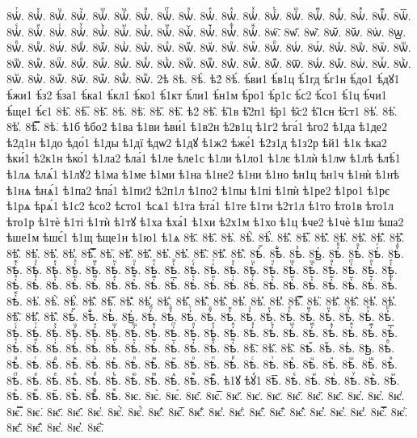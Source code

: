{8ѡ҆ⷮ.
8ѡ҆ⷯ.
8ѡ҆ⷰ.
8ѡ҆ⷱ.
8ѡ҆ⷲ.
8ѡ҆ⷳ.
8ѡ҆ⷴ.
8ѡ҆ⷵ.
8ѡ҆ⷶ.
8ѡ҆ⷷ.
8ѡ҆ⷸ.
8ѡ҆ⷹ.
8ѡ҆ⷺ.
8ѡ҆ⷻ.
8ѡ҆ⷼ.
8ѡ҆ⷽ.
8ѡ҆ⷾ.
8ѡ҆ⷿ.
8ѡ҆꙯.
8ѡ҆ꙴ.
8ѡ҆ꙵ.
8ѡ҆ꙶ.
8ѡ҆ꙷ.
8ѡ҆ꙸ.
8ѡ҆ꙹ.
8ѡ҆ꙺ.
8ѡ҆ꙻ.
8ѡ҆꙼.
8ѡ҆꙽.
8ѡ҆ꚞ.
8ѡ҆ꚟ.
8ѡ҇.
8ѡ᷀.
8ѡ᷁.
8ѡ᷶.
8ѡ᷷.
8ѡ᷸.
8ѡ᷹.
8ѡⷠ.
8ѡⷡ.
8ѡⷢ.
8ѡⷣ.
8ѡⷤ.
8ѡⷥ.
8ѡⷦ.
8ѡⷧ.
8ѡⷨ.
8ѡⷩ.
8ѡⷪ.
8ѡⷫ.
8ѡⷬ.
8ѡⷭ.
8ѡⷮ.
8ѡⷯ.
8ѡⷰ.
8ѡⷱ.
8ѡⷲ.
8ѡⷳ.
8ѡⷴ.
8ѡⷵ.
8ѡⷶ.
8ѡⷷ.
8ѡⷸ.
8ѡⷹ.
8ѡⷺ.
8ѡⷻ.
8ѡⷼ.
8ѡⷽ.
8ѡⷾ.
8ѡⷿ.
8ѡ꙯.
8ѡꙴ.
8ѡꙵ.
8ѡꙶ.
8ѡꙷ.
8ѡꙸ.
8ѡꙹ.
8ѡꙺ.
8ѡꙻ.
8ѡ꙼.
8ѡ꙽.
8ѡꚞ.
8ѡꚟ.
2ѣ
8ѣ.
8ѣ̀.
ѣ2́
8ѣ́.
ѣ́ви1
ѣ́в1ц
ѣ́1гд
ѣ́г1н
ѣ́до1
ѣ́дꙋ1
ѣ́жи1
ѣ́з2
ѣ́за1
ѣ́ка1
ѣ́кл1
ѣ́ко1
ѣ́1кт
ѣ́ли1
ѣ́н1м
ѣ́ро1
ѣ́р1с
ѣ́с2
ѣ́со1
ѣ́1ц
ѣ́чи1
ѣ́ще1
ѣ́є1
8ѣ̂.
8ѣ̅.
8ѣ̆.
8ѣ̇.
8ѣ̈.
8ѣ̋.
8ѣ̏.
ѣ2̑
8ѣ̑.
ѣ̑1в
ѣ̑2п1
ѣ̑р1
ѣ̑с2
ѣ̑1сн
ѣ̑ст1
8ѣ̓.
8ѣ̔.
8ѣ̾.
8ѣ̿.
8ѣ͘.
ѣ1б
ѣбо2
ѣ1ва
ѣ1ви
ѣви́1
ѣ1в2н
ѣ2в1ц
ѣ1г2
ѣга́1
ѣго2
ѣ1да
ѣ1де2
ѣ2д1н
ѣ1до
ѣдо́1
ѣ1ды
ѣ1дї
ѣдѡ2
ѣ1дꙋ
ѣ1ж2
ѣже́1
ѣ2з1д
ѣ1з2р
ѣй1
ѣ1к
ѣка2
ѣки́1
ѣ2к1н
ѣко́1
ѣ1ла2
ѣла́1
ѣ1ле
ѣле1с
ѣ1ли
ѣ1ло1
ѣ1лє
ѣ1лѝ
ѣ1лѡ
ѣ1лѣ
ѣлѣ́1
ѣ1лѧ
ѣлѧ́1
ѣ1лꙋ2
ѣ1ма
ѣ1ме
ѣ1ми
ѣ1на
ѣ1не2
ѣ1ни
ѣ1но
ѣн1ц
ѣн1ч
ѣ1нѝ
ѣ1нѣ
ѣ1нѧ
ѣнѧ́1
ѣ1па2
ѣпа́1
ѣ1пи2
ѣ2п1л
ѣ1по2
ѣ1пы
ѣ1пі
ѣ1пѝ
ѣ1ре2
ѣ1ро1
ѣ1рє
ѣ1рѧ
ѣрѧ́1
ѣ1с2
ѣсо2
ѣсто1
ѣсѧ1
ѣ1та
ѣта́1
ѣ1те
ѣ1ти
ѣ2т1л
ѣ1то
ѣто1в
ѣто1л
ѣто1р
ѣ1тѐ
ѣ1ті
ѣ1тѝ
ѣ1тꙋ
ѣ1ха
ѣха́1
ѣ1хи
ѣ2х1м
ѣ1хо
ѣ1ц
ѣче2
ѣ1чѐ
ѣ1ш
ѣша2
ѣше1м
ѣшє́1
ѣ1щ
ѣще1н
ѣ1ю1
ѣ1ѧ
8ѣ҃.
8ѣ҄.
8ѣ҅.
8ѣ҅̀.
8ѣ҅́.
8ѣ҅̂.
8ѣ҅̅.
8ѣ҅̆.
8ѣ҅̇.
8ѣ҅̈.
8ѣ҅̋.
8ѣ҅̏.
8ѣ҅̑.
8ѣ҅̓.
8ѣ҅̔.
8ѣ҅̾.
8ѣ҅̿.
8ѣ҅͘.
8ѣ҅҃.
8ѣ҅҄.
8ѣ҅҅.
8ѣ҅҆.
8ѣ҅҇.
8ѣ҅᷀.
8ѣ҅᷁.
8ѣ҅᷶.
8ѣ᷷҅.
8ѣ᷸҅.
8ѣ᷹҅.
8ѣ҅ⷠ.
8ѣ҅ⷡ.
8ѣ҅ⷢ.
8ѣ҅ⷣ.
8ѣ҅ⷤ.
8ѣ҅ⷥ.
8ѣ҅ⷦ.
8ѣ҅ⷧ.
8ѣ҅ⷨ.
8ѣ҅ⷩ.
8ѣ҅ⷪ.
8ѣ҅ⷫ.
8ѣ҅ⷬ.
8ѣ҅ⷭ.
8ѣ҅ⷮ.
8ѣ҅ⷯ.
8ѣ҅ⷰ.
8ѣ҅ⷱ.
8ѣ҅ⷲ.
8ѣ҅ⷳ.
8ѣ҅ⷴ.
8ѣ҅ⷵ.
8ѣ҅ⷶ.
8ѣ҅ⷷ.
8ѣ҅ⷸ.
8ѣ҅ⷹ.
8ѣ҅ⷺ.
8ѣ҅ⷻ.
8ѣ҅ⷼ.
8ѣ҅ⷽ.
8ѣ҅ⷾ.
8ѣ҅ⷿ.
8ѣ҅꙯.
8ѣ҅ꙴ.
8ѣ҅ꙵ.
8ѣ҅ꙶ.
8ѣ҅ꙷ.
8ѣ҅ꙸ.
8ѣ҅ꙹ.
8ѣ҅ꙺ.
8ѣ҅ꙻ.
8ѣ҅꙼.
8ѣ҅꙽.
8ѣ҅ꚞ.
8ѣ҅ꚟ.
8ѣ҆.
8ѣ҆̀.
8ѣ҆́.
8ѣ҆̂.
8ѣ҆̅.
8ѣ҆̆.
8ѣ҆̇.
8ѣ҆̈.
8ѣ҆̋.
8ѣ҆̏.
8ѣ҆̑.
8ѣ҆̓.
8ѣ҆̔.
8ѣ҆̾.
8ѣ҆̿.
8ѣ҆͘.
8ѣ҆҃.
8ѣ҆҄.
8ѣ҆҅.
8ѣ҆҆.
8ѣ҆҇.
8ѣ҆᷀.
8ѣ҆᷁.
8ѣ҆᷶.
8ѣ᷷҆.
8ѣ᷸҆.
8ѣ᷹҆.
8ѣ҆ⷠ.
8ѣ҆ⷡ.
8ѣ҆ⷢ.
8ѣ҆ⷣ.
8ѣ҆ⷤ.
8ѣ҆ⷥ.
8ѣ҆ⷦ.
8ѣ҆ⷧ.
8ѣ҆ⷨ.
8ѣ҆ⷩ.
8ѣ҆ⷪ.
8ѣ҆ⷫ.
8ѣ҆ⷬ.
8ѣ҆ⷭ.
8ѣ҆ⷮ.
8ѣ҆ⷯ.
8ѣ҆ⷰ.
8ѣ҆ⷱ.
8ѣ҆ⷲ.
8ѣ҆ⷳ.
8ѣ҆ⷴ.
8ѣ҆ⷵ.
8ѣ҆ⷶ.
8ѣ҆ⷷ.
8ѣ҆ⷸ.
8ѣ҆ⷹ.
8ѣ҆ⷺ.
8ѣ҆ⷻ.
8ѣ҆ⷼ.
8ѣ҆ⷽ.
8ѣ҆ⷾ.
8ѣ҆ⷿ.
8ѣ҆꙯.
8ѣ҆ꙴ.
8ѣ҆ꙵ.
8ѣ҆ꙶ.
8ѣ҆ꙷ.
8ѣ҆ꙸ.
8ѣ҆ꙹ.
8ѣ҆ꙺ.
8ѣ҆ꙻ.
8ѣ҆꙼.
8ѣ҆꙽.
8ѣ҆ꚞ.
8ѣ҆ꚟ.
8ѣ҇.
8ѣ᷀.
8ѣ᷁.
8ѣ᷶.
8ѣ᷷.
8ѣ᷸.
8ѣ᷹.
8ѣⷠ.
8ѣⷡ.
8ѣⷢ.
8ѣⷣ.
8ѣⷤ.
8ѣⷥ.
8ѣⷦ.
8ѣⷧ.
8ѣⷨ.
8ѣⷩ.
8ѣⷪ.
8ѣⷫ.
8ѣⷬ.
8ѣⷭ.
8ѣⷮ.
8ѣⷯ.
8ѣⷰ.
8ѣⷱ.
8ѣⷲ.
8ѣⷳ.
8ѣⷴ.
8ѣⷵ.
8ѣⷶ.
8ѣⷷ.
8ѣⷸ.
8ѣⷹ.
8ѣⷺ.
8ѣⷻ.
8ѣⷼ.
8ѣⷽ.
8ѣⷾ.
8ѣⷿ.
ѣ1ꙋ
ѣꙋ́1
8ѣ꙯.
8ѣꙴ.
8ѣꙵ.
8ѣꙶ.
8ѣꙷ.
8ѣꙸ.
8ѣꙹ.
8ѣꙺ.
8ѣꙻ.
8ѣ꙼.
8ѣ꙽.
8ѣꚞ.
8ѣꚟ.
8ѥ.
8ѥ̀.
8ѥ́.
8ѥ̂.
8ѥ̅.
8ѥ̆.
8ѥ̇.
8ѥ̈.
8ѥ̋.
8ѥ̏.
8ѥ̑.
8ѥ̓.
8ѥ̔.
8ѥ̾.
8ѥ̿.
8ѥ͘.
8ѥ҃.
8ѥ҄.
8ѥ҅.
8ѥ҅̀.
8ѥ҅́.
8ѥ҅̂.
8ѥ҅̅.
8ѥ҅̆.
8ѥ҅̇.
8ѥ҅̈.
8ѥ҅̋.
8ѥ҅̏.
8ѥ҅̑.
8ѥ҅̓.
8ѥ҅̔.
8ѥ҅̾.
8ѥ҅̿.
8ѥ҅͘.
8ѥ҅҃.
8ѥ҅҄.
8ѥ҅҅.
8ѥ҅҆.
8ѥ҅҇.
}
